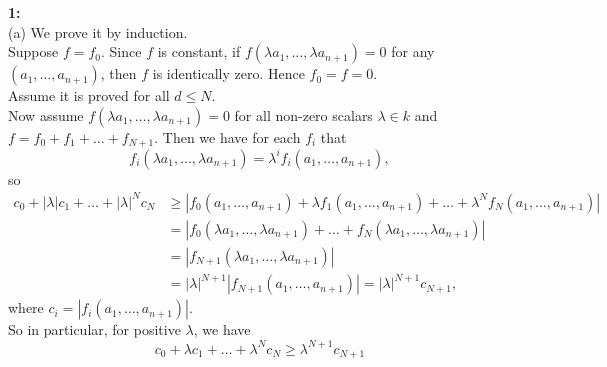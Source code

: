 \documentclass[a4paper]{article}
\begin{document}
    \textbf{1:}\\
    (a) We prove it by induction.\\
    Suppose $f = f_0$. Since $f$ is constant, if $f \left( \lambda a_1, \ldots
    , \lambda a_{n+1}\right) = 0$ for any $(a_1, \ldots, a_{n+1})$, then
    $f$ is identically zero. Hence $f_0 = f = 0$.\\
    Assume it is proved for all $d \le N$.\\
    Now assume
    $f \left( \lambda a_1, \ldots , \lambda a_{n+1} \right) = 0$ for all
    non-zero scalars $\lambda \in k$ and
    $f = f_0 + f_1 + \ldots + f_{N+1}$. 
    Then we have for each $f_i$ that
    \[
    f_i (\lambda a_1, \ldots, \lambda a_{n+1}) = \lambda^{i}
    f_i (a_1, \ldots, a_{n+1}),
    \] 
    so
    \begin{align*}
    c_0 + \left| \lambda \right| c_1 + \ldots +
     \left| \lambda \right|^{N} c_N
    &\geq \left| f_0 (a_1, \ldots, a_{n+1}) + 
    \lambda f_1 \left( a_1, \ldots, a_{n+1} \right) 
    + \ldots + \lambda^{N} f_{N}(a_1, \ldots, a_{n+1}) \right|\\
    &= \left| f_0 (\lambda a_1, \ldots, \lambda a_{n+1})
    + \ldots + f_N \left( \lambda a_1, \ldots, \lambda a_{n+1} \right) \right|
    \\
    &= \left| f_{N+1} \left( \lambda a_1, \ldots, \lambda a_{n+1} \right)
    \right|\\
    &= \left| \lambda \right|^{N+1} \left| f_{N+1}\left( a_1, \ldots, a_{n+1} \right)  \right| 
    = \left| \lambda \right|^{N+1} c_{N+1},
    \end{align*}
    where $c_i = \left| f_{i}(a_1, \ldots, a_{n+1}) \right| $.\\
    So in particular, for positive $\lambda$, we have
    \[
    c_0 + \lambda c_1 + \ldots + \lambda^{N} c_N \geq \lambda^{N+1} c_{N+1}
    \tag{$\zeta$}
    \] 
    
\end{document}
